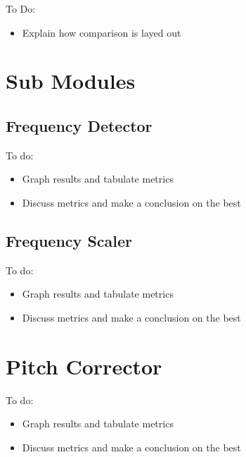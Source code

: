 
\color{red}
To Do:
\begin{itemize}
	\item Explain how comparison is layed out
\end{itemize}
\color{black}

\section{Sub Modules}

\subsection{Frequency Detector}

\color{red}
To do:
\begin{itemize}
	\item Graph results and tabulate metrics
	\item Discuss metrics and make a conclusion on the best
\end{itemize}
\color{black}

\subsection{Frequency Scaler}

\color{red}
To do:
\begin{itemize}
	\item Graph results and tabulate metrics
	\item Discuss metrics and make a conclusion on the best
\end{itemize}
\color{black}

\section{Pitch Corrector}

\color{red}
To do:
\begin{itemize}
	\item Graph results and tabulate metrics
	\item Discuss metrics and make a conclusion on the best
\end{itemize}
\color{black}
